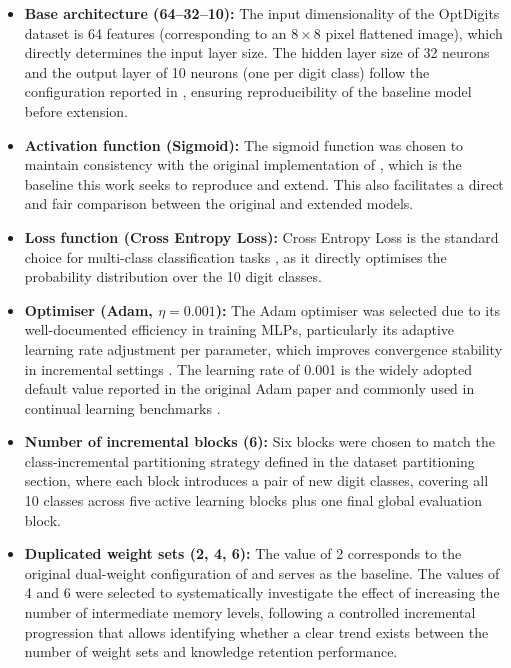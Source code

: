 \begin{itemize}
    \item \textbf{Base architecture (64--32--10):} The input dimensionality of the 
    OptDigits dataset is 64 features (corresponding to an $8 \times 8$ pixel 
    flattened image), which directly determines the input layer size. The hidden 
    layer size of 32 neurons and the output layer of 10 neurons (one per digit 
    class) follow the configuration reported in \cite{bullinaria2009}, ensuring 
    reproducibility of the baseline model before extension.

    \item \textbf{Activation function (Sigmoid):} The sigmoid function was chosen 
    to maintain consistency with the original implementation of \cite{bullinaria2009}, 
    which is the baseline this work seeks to reproduce and extend. This also 
    facilitates a direct and fair comparison between the original and extended models.

    \item \textbf{Loss function (Cross Entropy Loss):} Cross Entropy Loss is the 
    standard choice for multi-class classification tasks \cite{de2021continual}, 
    as it directly optimises the probability distribution over the 10 digit classes.

    \item \textbf{Optimiser (Adam, \(\eta = 0.001\)):} The Adam optimiser was 
    selected due to its well-documented efficiency in training MLPs, particularly 
    its adaptive learning rate adjustment per parameter, which improves convergence 
    stability in incremental settings \cite{kingma2014adam}. The learning rate of 
    0.001 is the widely adopted default value reported in the original Adam paper 
    and commonly used in continual learning benchmarks 
    \cite{kirkpatrick2017overcoming, zenke2017continual}.

    \item \textbf{Number of incremental blocks (6):} Six blocks were chosen to 
    match the class-incremental partitioning strategy defined in the dataset 
    partitioning section, where each block introduces a pair of new digit classes, 
    covering all 10 classes across five active learning blocks plus one final 
    global evaluation block.

    \item \textbf{Duplicated weight sets (2, 4, 6):} The value of 2 corresponds 
    to the original dual-weight configuration of \cite{bullinaria2009} and serves 
    as the baseline. The values of 4 and 6 were selected to systematically 
    investigate the effect of increasing the number of intermediate memory levels, 
    following a controlled incremental progression that allows identifying whether 
    a clear trend exists between the number of weight sets and knowledge retention 
    performance.
\end{itemize}

